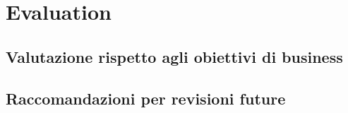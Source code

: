 \chapter{Evaluation}

\section{Valutazione rispetto agli obiettivi di business}

\section{Raccomandazioni per revisioni future}
